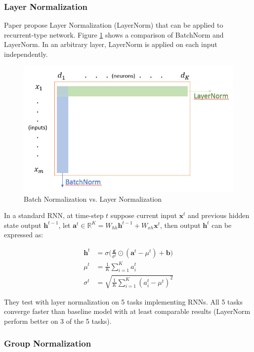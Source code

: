 \documentclass{article}
\begin{document}
\subsubsection{Layer Normalization}
Paper \cite{layernorm} propose Layer Normalization (LayerNorm) that can be applied to recurrent-type network. Figure \ref{fig:batchvslayernorm} shows a comparison of BatchNorm and LayerNorm.  In an arbitrary layer, LayerNorm is applied on each input independently. 

\begin{figure}[h]
	\centering
    \includegraphics[scale=0.5]{pics/batchNorm/BatchNorm_vs_LayerNorm.jpg}
	\caption{Batch Normalization vs. Layer Normalization}
	\label{fig:batchvslayernorm}
\end{figure}

In a standard RNN, at time-step $t$ suppose current input $\textbf{x}^t$ and previous hidden state output $\textbf{h}^{t-1}$, let $\textbf{a}^t \in \mathbb{R}^K = W_{hh}\textbf{h}^{t-1}+W_{xh}\textbf{x}^t$, then output $\textbf{h}^t$ can be expressed as:

\begin{align*}
    \textbf{h}^t&=\sigma\Big(\frac{\textbf{g}}{\sigma^t}\odot(\textbf{a}^t - \mu^t) + \textbf{b}\Big)\\
    \mu^t&=\frac{1}{K}\sum_{i=1}^Ka_i^t\\
    \sigma^t&=\sqrt{\frac{1}{K}\sum_{i=1}^K(a_i^t-\mu^t)^2}
\end{align*}

They test with layer normalization on 5 tasks implementing RNNs. All 5 tasks converge faster than baseline model with at least comparable results (LayerNorm perform better on 3 of the 5 tasks).

\subsubsection{Group Normalization}
\end{document}
